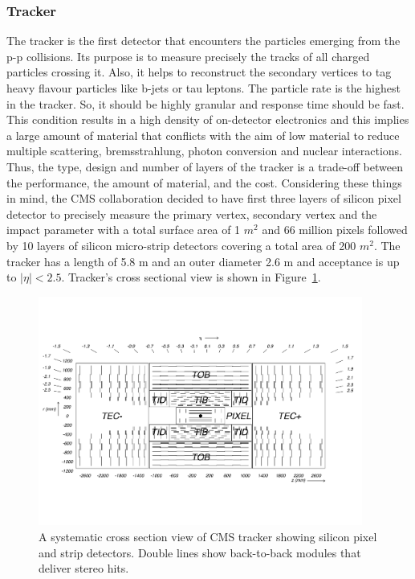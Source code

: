 \subsubsection{Tracker} %
\label{ssub:tracker}
The tracker is the first detector that encounters the particles emerging from the p-p collisions. Its purpose is to measure precisely the tracks of all charged particles crossing it. Also, it helps to reconstruct the secondary vertices to tag heavy flavour particles like b-jets or tau leptons. The particle rate is the highest in the tracker. So, it should be highly granular and response time should be fast. This condition results in a high density of on-detector electronics and this implies a large amount of material that conflicts with the aim of low material to reduce multiple scattering, bremsstrahlung, photon conversion and nuclear interactions. Thus, the type, design and number of layers of the tracker is a trade-off between the performance, the amount of material, and the cost. Considering these things in mind, the CMS collaboration decided to have first three layers of silicon pixel detector to precisely measure the primary vertex, secondary vertex and the impact parameter with a total surface area of 1 $m^2$ and 66 million pixels followed by 10 layers of  silicon micro-strip detectors covering a total area of 200 $m^2$. The tracker has a length of 5.8 m and an outer diameter 2.6 m and acceptance is up to $|\eta|<2.5$. Tracker's cross sectional view is shown in Figure~\ref{fig:tracker-cross-section}.

\begin{figure}[!htbp]
	\centering
	\includegraphics[width=0.95\textwidth]{figures/LHC/tracker-cross-section.pdf}
	\caption{A systematic cross section view of CMS tracker showing silicon pixel and strip detectors. Double lines show back-to-back modules that deliver stereo hits.}
	\label{fig:tracker-cross-section}
\end{figure}

